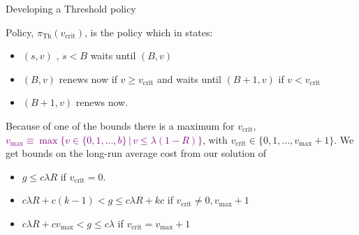 \documentclass[10pt]{beamer}
\begin{document}
\begin{frame}{Developing a Threshold policy}
\begin{definition}
Policy, $\pi_{\text{Th}}(v_{\text{crit}})$, is the policy which in states:
\begin{itemize}
\item $(s,v)$ , $s < B$ waits until $(B,v)$
\item $(B,v)$ renews now if $v \geq v_{\text{crit}}$ and waits until $(B+1,v)$ if $v < v_{\text{crit}}$
\item $(B+1,v)$ renews now.
\end{itemize}
\end{definition}
\pause
Because of one of the bounds there is a maximum for $v_{\text{crit}}$, \textcolor{purple}{$v_{\text{max}} \equiv \max \{ v \in \{0,1,...,b \} \, | \, v \leq \lambda (1-R) \} $}, with $v_{\text{crit}} \in \{0,1,...,v_{\text{max}}+1 \}$.
\pause
We get bounds on the long-run average cost from our solution of
\begin{itemize}
\item $g \leq c \lambda R$ if $v_{\text{crit}}=0$.

\item $c \lambda R +c(k-1) < g \leq c \lambda R + kc$ if $v_{\text{crit}} \neq 0,v_{\text{max}}+1$

\item $c \lambda R + c v_{\text{max}} < g \leq c \lambda$ if $v_{\text{crit}}=v_{\text{max}}+1$
\end{itemize}

\end{frame}
\end{document}
